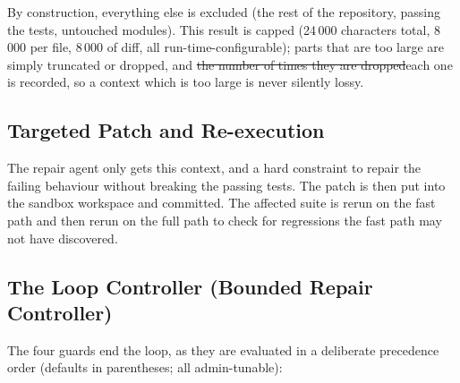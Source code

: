 \documentclass[pdflatex,sn-mathphys-num]{sn-jnl}%
\newcommand{\fix}[1]{{\color{fixcol}#1}}
\newcommand{\fixdel}[1]{{\color{fixcol}\sout{#1}}}
\newcommand{\rw}[2]{{\color{rwcol}#1}}%
\theoremstyle{thmstyleone}%
\theoremstyle{thmstyletwo}%
\theoremstyle{thmstylethree}%
\begin{document}
By construction, everything else is excluded (the rest of the repository, passing the tests, untouched modules). This result is capped (24\,000 characters total, 8\,000 per file, 8\,000 of diff, all run-time-configurable); parts that are too large are simply \fix{truncated or }dropped, and \fixdel{the number of times they are dropped}\fix{each one} is recorded, so a context which is too large is never silently lossy.%

\subsection{Targeted Patch and Re-execution}\label{sec5.2}

The repair agent only gets this context, and a hard constraint to repair the failing behaviour without breaking the passing tests. The patch is then put into the sandbox workspace and committed. The affected suite is rerun on the fast path and then rerun on the full path to check for regressions the fast path may not have discovered.

\subsection{The Loop Controller (Bounded Repair Controller)}\label{sec5.3}

\rw{The four guards end the loop, as they are evaluated in a deliberate precedence order (defaults \fix{in parentheses;} all admin-tunable):}{Four guards terminate the loop, evaluated in a deliberate precedence order (defaults in parentheses; all admin-tunable):}
\end{document}
